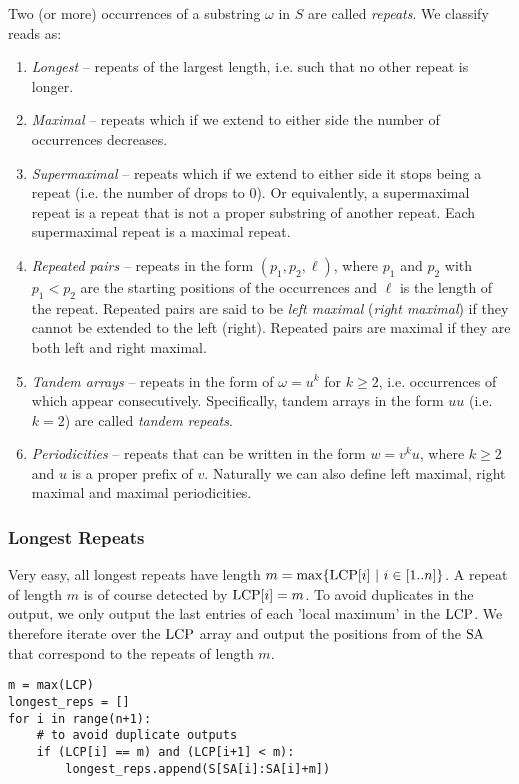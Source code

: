 Two (or more) occurrences of a substring $\omega$ in $S$ are called \emph{repeats}.
We classify reads as:
\begin{enumerate}
    \item \textit{Longest} -- repeats of the largest length, i.e. such that no other repeat is longer.
    \item \textit{Maximal} -- repeats which if we extend to either side the number of occurrences decreases.
    \item \textit{Supermaximal} -- repeats which if we extend to either side it stops being a repeat (i.e. the number of drops to $0$).
    Or equivalently, a supermaximal repeat is a repeat that is not a proper substring of another repeat.
    Each supermaximal repeat is a maximal repeat.
    \item \textit{Repeated pairs} -- repeats in the form $(p_1, p_2, \ell)$, where $p_1$ and $p_2$ with $p_1 < p_2$ are the starting positions of the occurrences and $\ell$ is the length of the repeat.
    Repeated pairs are said to be \textit{left maximal} (\textit{right maximal}) if they cannot be extended to the left (right).
    Repeated pairs are maximal if they are both left and right maximal.
    \item \textit{Tandem arrays} -- repeats in the form of $\omega = u^k$ for $k \geq 2$, i.e. occurrences of which appear consecutively.
    Specifically, tandem arrays in the form $uu$ (i.e. $k=2$) are called \textit{tandem repeats}.
    \item \textit{Periodicities} -- repeats that can be written in the form $w = v^ku$, where $k \geq 2$ and $u$ is a proper prefix of $v$. Naturally we can also define left maximal, right maximal and maximal periodicities.
\end{enumerate}

\subsubsection{Longest Repeats}
Very easy, all longest repeats have length $m = \max \{\text{LCP}[i] ~|~ i \in [1..n] \}$.
A repeat of length $m$ is of course detected by $\text{LCP}[i] = m$.
To avoid duplicates in the output, we only output the last entries of each 'local maximum' in the $\text{LCP}$.
We therefore iterate over the $\text{LCP}$ array and output the positions from of the $\text{SA}$ that correspond to the repeats of length $m$.

\begin{verbatim}
m = max(LCP)
longest_reps = []
for i in range(n+1):
    # to avoid duplicate outputs
    if (LCP[i] == m) and (LCP[i+1] < m):
        longest_reps.append(S[SA[i]:SA[i]+m])
\end{verbatim}

